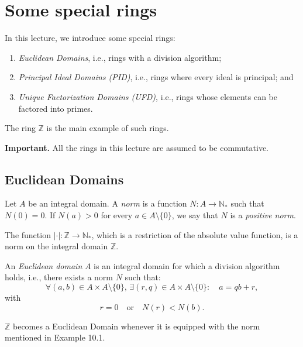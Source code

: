 \documentclass[11pt,a4paper]{article}
\begin{document}
\def\contador{Lesson 12}


\section{Some special rings}

In this lecture, we introduce some special rings:
\begin{enumerate}[label=(\roman*)]
    \item \textit{Euclidean Domains}, i.e., rings with a division algorithm;
    \item \textit{Principal Ideal Domains (PID)}, i.e., rings where every ideal is principal; and
    \item \textit{Unique Factorization Domains (UFD)}, i.e., rings whose elements can be factored into primes.
\end{enumerate}

The ring $\mathbb{Z}$ is the main example of such rings.

\textbf{Important.} All the rings in this lecture are assumed to be commutative.

\subsection{Euclidean Domains}

Let $A$ be an integral domain. A \textit{norm} is a function $N : A \to \mathbb{N}_*$ such that $N(0) = 0$. If $N(a) > 0$ for every $a \in A \setminus \{0\}$, we say that $N$ is a \textit{positive norm}.

\begin{exa}[10.1]
The function $|\cdot| : \mathbb{Z} \to \mathbb{N}_*$, which is a restriction of the absolute value function, is a norm on the integral domain $\mathbb{Z}$.
\end{exa}

An \textit{Euclidean domain} $A$ is an integral domain for which a division algorithm holds, i.e., there exists a norm $N$ such that:
\[
\forall (a,b) \in A \times A \setminus \{0\}, \, \exists (r,q) \in A \times A \setminus \{0\} : \quad a = qb + r,
\]
with
\[
r = 0 \quad \text{or} \quad N(r) < N(b).
\]

\begin{exa}
$\mathbb{Z}$ becomes a Euclidean Domain whenever it is equipped with the norm mentioned in Example 10.1.
\end{exa}
\end{document}
